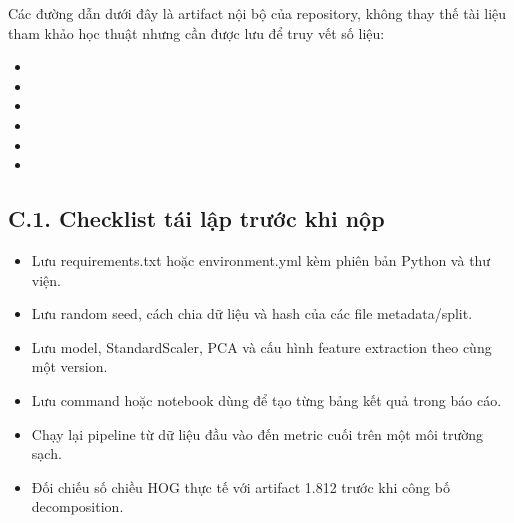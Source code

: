 \documentclass[12pt,a4paper]{article}
\begin{document}
Các đường dẫn dưới đây là artifact nội bộ của repository, không thay thế
tài liệu tham khảo học thuật nhưng cần được lưu để truy vết số liệu:

\begin{itemize}
\item
\item
\item
\item
\item
\item
\end{itemize}

\subsection{C.1. Checklist tái lập trước khi
nộp}\label{c.1.-checklist-tuxe1i-lux1eadp-trux1b0ux1edbc-khi-nux1ed9p}

\begin{itemize}
\item
  Lưu requirements.txt hoặc environment.yml kèm phiên bản Python và thư
  viện.
\item
  Lưu random seed, cách chia dữ liệu và hash của các file
  metadata/split.
\item
  Lưu model, StandardScaler, PCA và cấu hình feature extraction theo
  cùng một version.
\item
  Lưu command hoặc notebook dùng để tạo từng bảng kết quả trong báo cáo.
\item
  Chạy lại pipeline từ dữ liệu đầu vào đến metric cuối trên một môi
  trường sạch.
\item
  Đối chiếu số chiều HOG thực tế với artifact 1.812 trước khi công bố
  decomposition.
\end{itemize}
\end{document}
